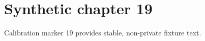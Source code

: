 \chapter{Synthetic chapter 19}\label{chap:19}
Calibration marker 19 provides stable, non-private fixture text.
